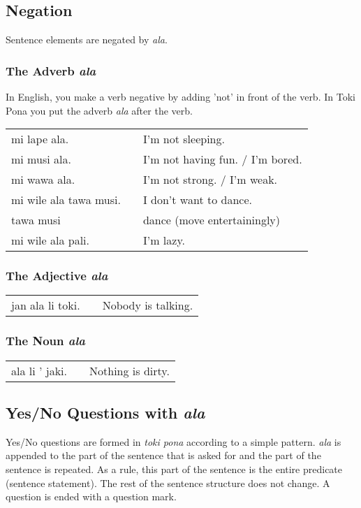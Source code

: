 \newpage

\subsection*{Negation}
Sentence elements are negated by \textit{ala}.

\subsubsection*{The Adverb \textit{ala}}
In English, you make a verb negative by adding 'not' in front of the verb.
In Toki Pona you put the adverb \textit{ala} after the verb.

\begin{supertabular}{p{5,5cm}|ll}
    mi lape ala.           &  & I'm not sleeping.                \\
    mi musi ala.           &  & I'm not having fun. / I'm bored. \\
    mi wawa ala.           &  & I'm not strong. / I'm weak.      \\
    mi wile ala tawa musi. &  & I don't want to dance.           \\
    tawa musi              &  & dance (move entertainingly)      \\
    mi wile ala pali.      &  & I'm lazy.                        \\
\end{supertabular}

\subsubsection*{The Adjective \textit{ala}}
\begin{supertabular}{p{5,5cm}|ll}
    jan ala li toki. &  & Nobody is talking. \\
\end{supertabular}

\subsubsection*{The Noun \textit{ala}}
\begin{supertabular}{p{5,5cm}|ll}
    ala li ' jaki. &  & Nothing is dirty. \\
\end{supertabular}

\subsection*{Yes/No Questions with \textit{ala}}
Yes/No questions are formed in \textit{toki pona} according to a simple pattern.
\textit{ala} is appended to the part of the sentence that is asked for and the part of the sentence is repeated.
As a rule, this part of the sentence is the entire predicate (sentence statement).
The rest of the sentence structure does not change.
A question is ended with a question mark.

